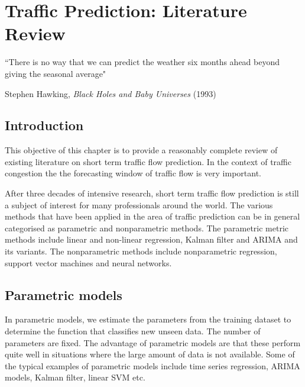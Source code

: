 
\chapter{Traffic Prediction: Literature Review}

\label{Chapter2}


{``There is no way that we can predict the weather six months ahead beyond giving the seasonal
average"}
\begin{flushright}
Stephen Hawking, \textit{Black Holes and Baby Universes} (1993)
\end{flushright}

\section{Introduction}
This objective of this chapter is to provide a reasonably complete review of existing literature on
short term traffic flow prediction. In the context of traffic congestion the the forecasting window
of traffic flow is very important.

After three decades of intensive research, short term traffic flow prediction is still a subject of
interest for many professionals around the world.  The various methods that have been applied in
the area of traffic prediction can be in general categorised as parametric and nonparametric
methods. The parametric metric methods include linear and non-linear regression, Kalman filter and
ARIMA and its variants. The nonparametric methods include nonparametric regression, support vector
machines and neural networks.

\section{Parametric models}
In parametric models, we estimate the parameters from the training dataset to determine the
function that classifies new unseen data. The number of parameters are fixed. The advantage of
parametric models are that these perform quite well in situations where the large amount of data
is not available. Some of the typical examples of parametric models include time series
regression, ARIMA models, Kalman filter, linear SVM etc.

